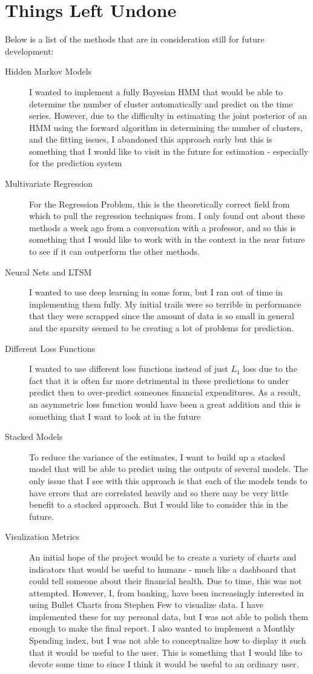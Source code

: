 \documentclass[11pt,a4paper]{article}
\begin{document}
\section{Things Left Undone}

Below is a list of the methods that are in consideration still for future development:
\begin{description}
	\item[Hidden Markov Models] I wanted to implement a fully Bayesian HMM that would be able to determine the number of cluster automatically and predict on the time series. However, due to the difficulty in estimating the joint posterior of an HMM using the forward algorithm in determining the number of clusters, and the fitting issues, I abandoned this approach early but this is something that I would like to visit in the future for estimation - especially for the \yinyang prediction system
	\item[Multivariate Regression] For the \yinyang Regression Problem, this is the theoretically correct field from which to pull the regression techniques from. I only found out about these methods a week ago from a conversation with a professor, and so this is something that I would like to work with in the \yinyang context in the near future to see if it can outperform the other methods. 
	\item[Neural Nets and LTSM] I wanted to use deep learning in some form, but I ran out of time in implementing them fully. My initial trails were so terrible in performance that they were scrapped since the amount of data is so small in general and the sparsity seemed to be creating a lot of problems for prediction. 
	\item[Different Loss Functions] I wanted to use different loss functions instead of just $ L_1 $ loss due to the fact that it is often far more detrimental in these predictions to under predict then to over-predict someones financial expenditures. As a result, an asymmetric loss function would have been a great addition and this is something that I want to look at in the future
	\item[Stacked Models] To reduce the variance of the estimates, I want to build up a stacked model that will be able to predict using the outputs of several models. The only issue that I see with this approach is that each of the models tends to have errors that are correlated heavily and so there may be very little benefit to a stacked approach. But I would like to consider this in the future. 
	\item[Visulization Metrics] An initial hope of the project would be to create a variety of charts and indicators that would be useful to humans - much like a dashboard that could tell someone about their financial health. Due to time, this was not attempted. However, I, from banking, have been increasingly interested in using Bullet Charts from Stephen Few to visualize data. I have implemented these for my personal data, but I was not able to polish them enough to make the final report. I also wanted to implement a Monthly Spending index, but I was not able to conceptualize how to display it such that it would be useful to the user. This is something that I would like to devote some time to since I think it would be useful to an ordinary user. 

\end{description}
\end{document}
